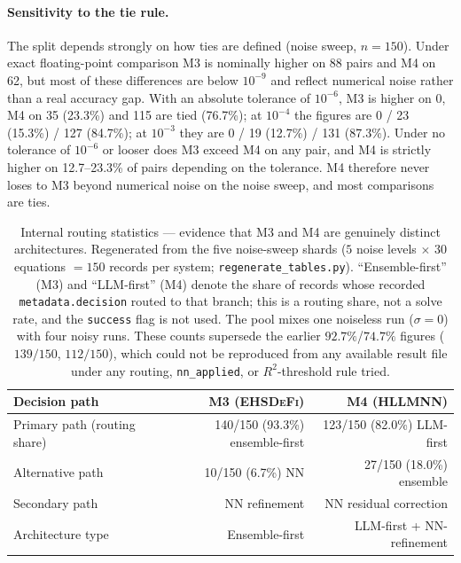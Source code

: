 \documentclass[twoside,11pt]{article}
\newcommand{\EHD}{\textsc{EHSDeFi}}
\newcommand{\HSL}{\textsc{HLLMNN}}
\newcommand{\Rsq}{R^{2}}
\begin{document}
\paragraph{Sensitivity to the tie rule.}
The split depends strongly on how ties are defined (noise sweep, $n=150$).
Under exact floating-point comparison M3 is nominally higher on 88 pairs and M4 on
62, but most of these differences are below $10^{-9}$ and reflect numerical noise
rather than a real accuracy gap. With an absolute tolerance of $10^{-6}$, M3 is
higher on 0, M4 on 35 (23.3\%) and 115 are tied (76.7\%); at $10^{-4}$ the figures
are 0 / 23 (15.3\%) / 127 (84.7\%); at $10^{-3}$ they are 0 / 19 (12.7\%) /
131 (87.3\%). Under no tolerance of $10^{-6}$ or looser does M3 exceed M4 on any
pair, and M4 is strictly higher on 12.7--23.3\% of pairs depending on the
tolerance. M4 therefore never loses to M3 beyond numerical noise on the noise
sweep, and most comparisons are ties.

\begin{table}[H]
\centering
\caption{Internal routing statistics --- evidence that M3 and M4 are genuinely
         distinct architectures. Regenerated from the five noise-sweep shards
         ($5$ noise levels $\times$ $30$ equations $= 150$ records per system;
         \texttt{regenerate\_tables.py}). ``Ensemble-first'' (M3) and
         ``LLM-first'' (M4) denote the share of records whose recorded
         \texttt{metadata.decision} routed to that branch; this is a routing
         share, not a solve rate, and the \texttt{success} flag is not used.
         The pool mixes one noiseless run ($\sigma=0$) with four noisy runs.
         These counts supersede the earlier $92.7\%$/$74.7\%$ figures
         ($139/150$, $112/150$), which could not be reproduced from any
         available result file under any routing, \texttt{nn\_applied}, or
         $\Rsq$-threshold rule tried.}
\label{tab:arch}
\small
\begin{tabular}{L{3.5cm} r r}
\toprule
\textbf{Decision path} & \textbf{M3 (\EHD)} & \textbf{M4 (\HSL)}\\
\midrule
Primary path (routing share)
                & 140/150 (93.3\%) ensemble-first & 123/150 (82.0\%) LLM-first\\
Alternative path
                & 10/150 (6.7\%) NN              & 27/150 (18.0\%) ensemble\\
Secondary path  & NN refinement                  & NN residual correction\\
Architecture type & Ensemble-first               & LLM-first + NN-refinement\\
\bottomrule
\end{tabular}
\end{table}
\end{document}
